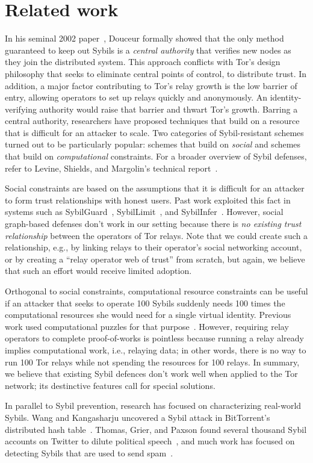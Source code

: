 \section{Related work}
\label{sec:related_work}
In his seminal 2002 paper~\cite{Douceur2002a}, Douceur formally showed that the
only method guaranteed to keep out Sybils is a \emph{central authority} that
verifies new nodes as they join the distributed system.  This approach conflicts
with Tor's design philosophy that seeks to eliminate central points of control,
to distribute trust.  In addition, a major factor contributing to Tor's relay
growth is the low barrier of entry, allowing operators to set up relays quickly
and anonymously.  An identity-verifying authority would raise that barrier and
thwart Tor's growth.  Barring a central authority, researchers have proposed
techniques that build on a resource that is difficult for an attacker to scale.
Two categories of Sybil-resistant schemes turned out to be particularly popular:
schemes that build on \emph{social} and schemes that build on
\emph{computational} constraints.  For a broader overview of Sybil defenses,
refer to Levine, Shields, and Margolin's technical report~\cite{Levine2006a}.

Social constraints are based on the assumptions that it is difficult for an
attacker to form trust relationships with honest users.  Past work exploited
this fact in systems such as SybilGuard~\cite{Yu2006a},
SybilLimit~\cite{Yu2008a}, and SybilInfer~\cite{Danezis2009a}.  However, social
graph-based defenses don't work in our setting because there is \emph{no
existing trust relationship} between the operators of Tor relays.  Note that we
could create such a relationship, e.g., by linking relays to their operator's
social networking account, or by creating a ``relay operator web of trust'' from
scratch, but again, we believe that such an effort would receive limited
adoption.

Orthogonal to social constraints, computational resource constraints can be
useful if an attacker that seeks to operate 100 Sybils suddenly needs 100 times
the computational resources she would need for a single virtual identity.
Previous work used computational puzzles for that
purpose~\cite{Borisov2006a,Li2012a}.  However, requiring relay operators to
complete proof-of-works is pointless because running a relay already implies
computational work, i.e., relaying data; in other words, there is no way to run
100 Tor relays while not spending the resources for 100 relays.  In summary, we
believe that existing Sybil defences don't work well when applied to the Tor
network; its destinctive features call for special solutions.

In parallel to Sybil prevention, research has focused on characterizing
real-world Sybils.  Wang and Kangasharju uncovered a Sybil attack in
BitTorrent's distributed hash table~\cite{Wang2012a}.  Thomas, Grier, and Paxson
found several thousand Sybil accounts on Twitter to dilute political
speech~\cite{Thomas2012a}, and much work has focused on detecting Sybils that
are used to send spam~\cite{Gao2010a}.
